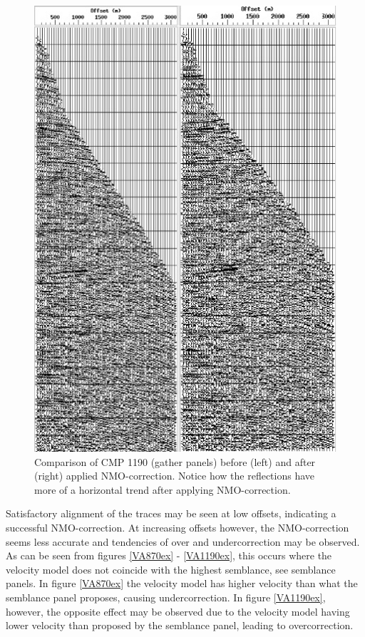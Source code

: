 \documentclass[10pt,a4paper]{article}
\begin{document}
\begin{figure}[H]
\includegraphics[width=\textwidth]{beforeAfter_NMOcorr_1190.jpg}
\caption{Comparison of CMP 1190 (gather panels) before (left) and after (right) applied NMO-correction. Notice how the reflections have more of a horizontal trend after applying NMO-correction.}
\label{NMO1190}
\end{figure}

\noindent Satisfactory alignment of the traces may be seen at low offsets, indicating a successful NMO-correction. At increasing offsets however, the NMO-correction seems less accurate and tendencies of over and undercorrection may be observed. As can be seen from figures \ref{VA870ex} - \ref{VA1190ex}, this occurs where the velocity model does not coincide with the highest semblance, see semblance panels. In figure \ref{VA870ex} the velocity model has higher velocity than what the semblance panel proposes, causing undercorrection. In figure \ref{VA1190ex}, however, the opposite effect may be observed due to the velocity model having lower velocity than proposed by the semblance panel, leading to overcorrection.
\end{document}
